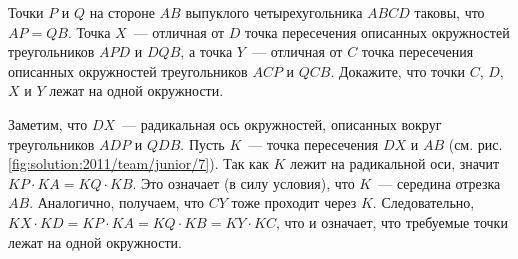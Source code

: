 Точки $P$ и $Q$ на стороне $AB$ выпуклого четырехугольника $ABCD$ таковы, что
$AP = QB$.
Точка $X$~--- отличная от $D$ точка пересечения описанных окружностей
треугольников $APD$ и $DQB$, а точка $Y$~--- отличная от $C$ точка пересечения
описанных окружностей треугольников $ACP$ и $QCB$.
Докажите, что точки $C$, $D$, $X$ и $Y$ лежат на одной окружности.

%
\label{solution:2011/team/junior/7}%
Заметим, что $DX$~--- радикальная ось окружностей, описанных вокруг
треугольников $ADP$ и $QDB$.
Пусть $K$~--- точка пересечения $DX$ и $AB$
(см. рис. \ref{fig:solution:2011/team/junior/7}).
Так как $K$ лежит на радикальной оси, значит $KP \cdot KA = KQ \cdot KB$.
Это означает (в силу условия), что $K$~--- середина отрезка $AB$.
Аналогично, получаем, что $CY$ тоже проходит через $K$.
Следовательно, $KX \cdot KD = KP \cdot KA = KQ \cdot KB = KY \cdot KC$, что и
означает, что требуемые точки лежат на одной окружности.

